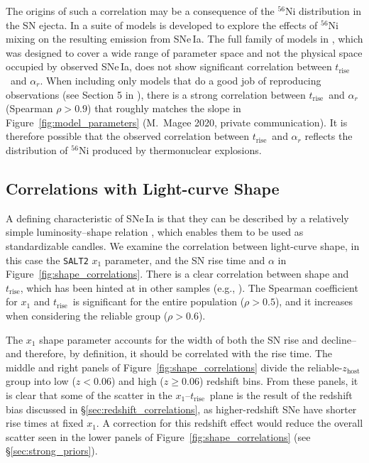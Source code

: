 \documentclass[twocolumn]{./aastex63}
\newcommand{\trise}{$t_\mathrm{rise}$}
\begin{document}
The origins of such a correlation may be a consequence of the $^{56}$Ni
distribution in the SN ejecta. In \citet{Magee20} a suite of models is
developed to explore the effects of $^{56}$Ni mixing on the resulting emission
from SNe\,Ia. The full family of models in \citet{Magee20}, which was designed
to cover a wide range of parameter space and not the physical space occupied
by observed SNe\,Ia, does not show significant correlation between \trise\ and
$\alpha_r$. When including only models that do a good job of reproducing
observations (see Section 5 in \citealt{Magee20}), there is a strong
correlation between \trise\ and $\alpha_r$ (Spearman $\rho > 0.9$) that
roughly matches the slope in Figure~\ref{fig:model_parameters} (M.~Magee 2020,
private communication). It is therefore possible that the observed correlation
between \trise\ and $\alpha_r$ reflects the distribution of $^{56}$Ni produced
by thermonuclear explosions.

\subsection{Correlations with Light-curve Shape}

A defining characteristic of SNe\,Ia is that they can be described by a
relatively simple luminosity--shape relation \citep{Phillips93}, which enables
them to be used as standardizable candles. We examine the correlation between
light-curve shape, in this case the \texttt{SALT2} $x_1$ parameter, and the SN
rise time and $\alpha$ in Figure~\ref{fig:shape_correlations}. There is a
clear correlation between shape and \trise, which has been hinted at in other
samples (e.g., \citealt{Riess99a,Gonzalez-Gaitan12,Firth15,Zheng17a}). The
Spearman coefficient for $x_1$ and \trise\ is significant for the entire
population ($\rho > 0.5$), and it increases when considering the reliable
group ($\rho > 0.6$).

The $x_1$ shape parameter accounts for the width of both the SN rise and
decline--and therefore, by definition, it should be correlated with the rise
time. The middle and right panels of Figure~\ref{fig:shape_correlations}
divide the reliable-$z_\mathrm{host}$ group into low ($z < 0.06$) and high ($z
\ge 0.06$) redshift bins. From these panels, it is clear that some of the
scatter in the $x_1$--\trise\ plane is the result of the redshift bias
discussed in \S\ref{sec:redshift_correlations}, as higher-redshift SNe have
shorter rise times at fixed $x_1$. A correction for this redshift effect would
reduce the overall scatter seen in the lower panels of
Figure~\ref{fig:shape_correlations} (see \S\ref{sec:strong_priors}).
\end{document}
